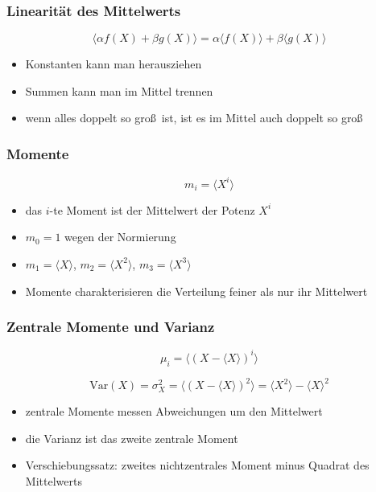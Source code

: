 \documentclass[aspectratio=169,professionalfonts]{beamer}
\begin{document}
\begin{frame}
  \frametitle{Linearit\"at des Mittelwerts}

  \[
    \langle \alpha f(X)+\beta g(X)\rangle
    =
    \alpha \langle f(X)\rangle+\beta \langle g(X)\rangle
  \]

  \vspace{0.4cm}

  \begin{itemize}
    \item Konstanten kann man herausziehen
    \item Summen kann man im Mittel trennen
    \item wenn alles doppelt so gro\ss\ ist, ist es im Mittel auch doppelt so gro\ss
  \end{itemize}
\end{frame}

\begin{frame}
  \frametitle{Momente}

  \[
    m_i=\langle X^i\rangle
  \]

  \vspace{0.3cm}

  \begin{itemize}
    \item das \(i\)-te Moment ist der Mittelwert der Potenz \(X^i\)
    \item \(m_0=1\) wegen der Normierung
    \item \(m_1=\langle X\rangle\), \quad \(m_2=\langle X^2\rangle\), \quad \(m_3=\langle X^3\rangle\)
    \item Momente charakterisieren die Verteilung feiner als nur ihr Mittelwert
  \end{itemize}
\end{frame}

\begin{frame}
  \frametitle{Zentrale Momente und Varianz}

  \[
    \mu_i=\langle (X-\langle X\rangle)^i\rangle
  \]

  \[
    \mathrm{Var}(X)=\sigma_X^2
    =
    \langle (X-\langle X\rangle)^2\rangle
    =
    \langle X^2\rangle-\langle X\rangle^2
  \]

  \vspace{0.25cm}

  \begin{itemize}
    \item zentrale Momente messen Abweichungen um den Mittelwert
    \item die Varianz ist das zweite zentrale Moment
    \item \glqq Verschiebungssatz\grqq: zweites nichtzentrales Moment minus Quadrat des Mittelwerts
  \end{itemize}
\end{frame}
\end{document}

